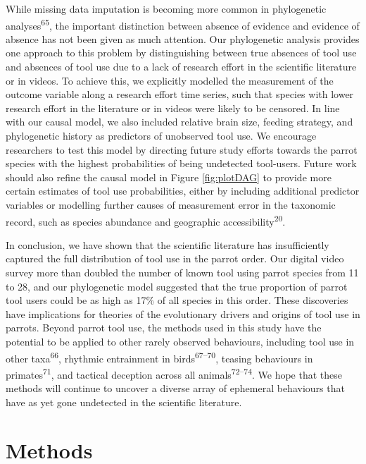 \documentclass[
  man, donotrepeattitle,floatsintext]{apa6}
\begin{document}
While missing data imputation is becoming more common in phylogenetic
analyses\textsuperscript{65}, the important distinction between absence of
evidence and evidence of absence has not been given as much attention. Our
phylogenetic analysis provides one approach to this problem by distinguishing
between true absences of tool use and absences of tool use due to a lack of
research effort in the scientific literature or in videos. To achieve this, we
explicitly modelled the measurement of the outcome variable along a research
effort time series, such that species with lower research effort in the
literature or in videos were likely to be censored. In line with our causal
model, we also included relative brain size, feeding strategy, and phylogenetic
history as predictors of unobserved tool use. We encourage researchers to test
this model by directing future study efforts towards the parrot species with the
highest probabilities of being undetected tool-users. Future work should also
refine the causal model in Figure \ref{fig:plotDAG} to provide more certain
estimates of tool use probabilities, either by including additional predictor
variables or modelling further causes of measurement error in the taxonomic
record, such as species abundance and geographic accessibility\textsuperscript{20}.

In conclusion, we have shown that the scientific literature has insufficiently
captured the full distribution of tool use in the parrot order. Our
digital video survey more than doubled the number of known tool using parrot
species from 11 to 28, and our phylogenetic model suggested that the true
proportion of parrot tool users could be as high as 17\% of all species in this
order. These discoveries have implications for theories of the evolutionary
drivers and origins of tool use in parrots. Beyond parrot tool use, the
methods used in this study have the potential to be applied to other rarely
observed behaviours, including tool use in other taxa\textsuperscript{66}, rhythmic
entrainment in birds\textsuperscript{67--70},
teasing behaviours in primates\textsuperscript{71}, and tactical deception across all
animals\textsuperscript{72--74}. We hope that these methods
will continue to uncover a diverse array of ephemeral behaviours that have as
yet gone undetected in the scientific literature.

\hypertarget{methods}{%
\section{Methods}\label{methods}}
\end{document}
